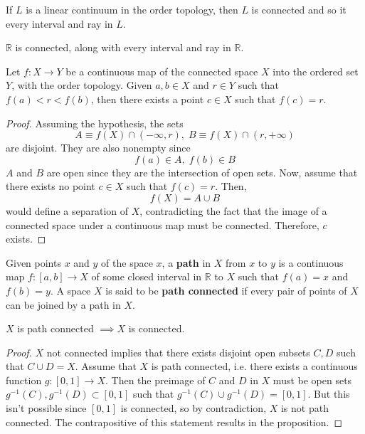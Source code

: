 \documentclass{article}
\begin{document}
    \begin{theorem}
    If $L$ is a linear continuum in the order topology, then $L$ is connected and so it every interval and ray in $L$. 
    \end{theorem}

    \begin{corollary}
    $\mathbb{R}$ is connected, along with every interval and ray in $\mathbb{R}$. 
    \end{corollary}

    \begin{theorem}
    Let $f: X \longrightarrow Y$ be a continuous map of the connected space $X$ into the ordered set $Y$, with the order topology. Given $a, b \in X$ and $r \in Y$ such that $f(a)<r<f(b)$, then there exists a point $c \in X$ such that $f(c) = r$. 
    \end{theorem}
    \begin{proof}
    Assuming the hypothesis, the sets 
    \[A \equiv f(X) \cap (-\infty, r), \; B \equiv f(X) \cap (r, +\infty)\]
    are disjoint. They are also nonempty since 
    \[f(a) \in A, \; f(b) \in B\]
    $A$ and $B$ are open since they are the intersection of open sets. Now, assume that there exists no point $c \in X$ such that $f(c) = r$. Then, 
    \[f(X) = A \cup B\]
    would define a separation of $X$, contradicting the fact that the image of a connected space under a continuous map must be connected. Therefore, $c$ exists. 
    \end{proof}

    \begin{definition}
    Given points $x$ and $y$ of the space $x$, a \textbf{path} in $X$ from $x$ to $y$ is a continuous map $f: [a,b] \longrightarrow X$ of some closed interval in $\mathbb{R}$ to $X$ such that $f(a) = x$ and $f(b)=y$. A space $X$ is said to be \textbf{path connected} if every pair of points of $X$ can be joined by a path in $X$. 
    \end{definition}

    \begin{proposition}
    $X$ is path connected $\implies X$ is connected. 
    \end{proposition}
    \begin{proof}
    $X$ not connected implies that there exists disjoint open subsets $C, D$ such that $C \cup D = X$. Assume that $X$ is path connected, i.e. there exists a continuous function $g: [0,1] \longrightarrow X$. Then the preimage of $C$ and $D$ in $X$ must be open sets $g^{-1} (C), g^{-1} (D) \subset [0,1]$ such that $g^{-1}(C) \cup g^{-1}(D) = [0,1]$. But this isn't possible since $[0,1]$ is connected, so by contradiction, $X$ is not path connected. The contrapositive of this statement results in the proposition. 
    \end{proof}
\end{document}
